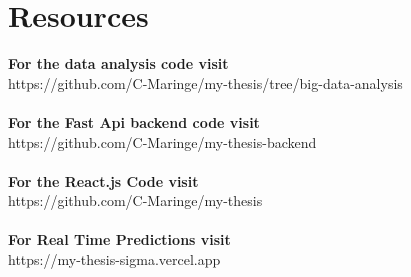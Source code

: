 \chapter{Resources}

\textbf{For the data analysis code visit} \\
https://github.com/C-Maringe/my-thesis/tree/big-data-analysis \\\\
\textbf{For the Fast Api backend code visit} \\
https://github.com/C-Maringe/my-thesis-backend \\\\
\textbf{For the React.js Code visit} \\
https://github.com/C-Maringe/my-thesis \\\\
\textbf{For Real Time Predictions visit} \\
https://my-thesis-sigma.vercel.app \\\\
